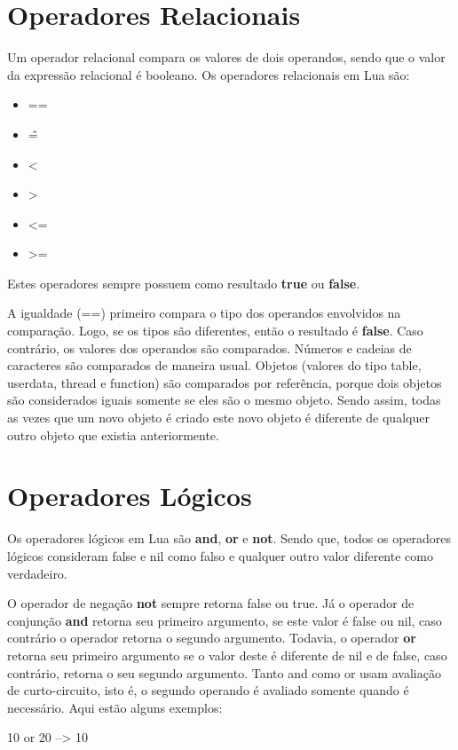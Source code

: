 \documentclass[
12pt, %
openright, %
oneside, %
a4paper, %
english, %
brazil, %
]{abntex2}
\begin{document}
\section{Operadores Relacionais}
Um operador relacional compara os valores de dois operandos, sendo que o valor da expressão relacional é booleano. Os operadores relacionais em Lua são:

\begin{itemize}
  \item ==
  \item \~=
  \item <
  \item >
  \item <=
  \item >=
\end{itemize}

Estes operadores sempre possuem como resultado \textbf{true} ou \textbf{false}.

A igualdade (==) primeiro compara o tipo dos operandos envolvidos na comparação. Logo, se os tipos são diferentes, então o resultado é \textbf{false}. Caso contrário, os valores dos operandos são comparados. Números e cadeias de caracteres são comparados de maneira usual. Objetos (valores do tipo table, userdata, thread e function) são comparados por referência, porque dois objetos são considerados iguais somente se eles são o mesmo objeto. Sendo assim, todas as vezes que um novo objeto é criado este novo objeto é diferente de qualquer outro objeto que existia anteriormente.

\section{Operadores Lógicos}
Os operadores lógicos em Lua são \textbf{and}, \textbf{or} e \textbf{not}. Sendo que, todos os operadores lógicos consideram false e nil como falso e qualquer outro valor diferente como verdadeiro.

O operador de negação \textbf{not} sempre retorna false ou true. Já o operador de conjunção \textbf{and} retorna seu primeiro argumento, se este valor é false ou nil, caso contrário o operador retorna o segundo argumento. Todavia, o operador \textbf{or} retorna seu primeiro argumento se o valor deste é diferente de nil e de false, caso contrário, retorna o seu segundo argumento. Tanto and como or usam avaliação de curto-circuito, isto é, o segundo operando é avaliado somente quando é necessário. Aqui estão alguns exemplos:

10 or 20            --> 10
\end{document}
